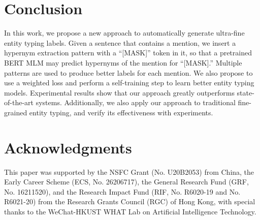 \documentclass[11pt,a4paper]{article}
\begin{document}
\section{Conclusion}

In this work, we propose a new approach to automatically generate ultra-fine entity typing labels. Given a sentence that contains a mention, we insert a hypernym extraction pattern with a ``[MASK]'' token in it, so that a pretrained BERT MLM may predict hypernyms of the mention for ``[MASK].''  Multiple patterns are used to produce better labels for each mention. We also propose to use a weighted loss and perform a self-training step to learn better entity typing models. Experimental results show that our approach greatly outperforms state-of-the-art systems. Additionally, we also apply our approach to traditional fine-grained entity typing, and verify its effectiveness with experiments.


\section*{Acknowledgments}

This paper was supported by the NSFC Grant (No. U20B2053) from China, the Early Career Scheme (ECS, No. 26206717), the General Research Fund (GRF, No. 16211520), and the Research Impact Fund (RIF, No. R6020-19 and No. R6021-20) from the Research Grants Council (RGC) of Hong Kong, with special thanks to the WeChat-HKUST WHAT Lab on Artificial Intelligence Technology.





\end{document}
